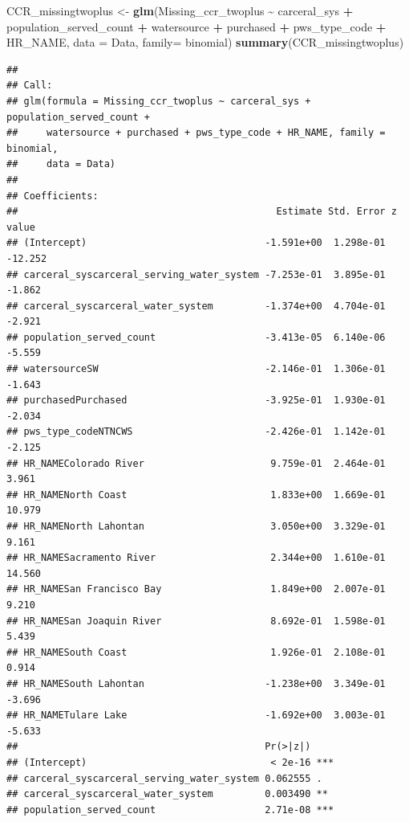 \documentclass[
]{article}
\newenvironment{Shaded}{\begin{snugshade}}{\end{snugshade}}
\newcommand{\AttributeTok}[1]{\textcolor[rgb]{0.13,0.29,0.53}{#1}}
\newcommand{\FunctionTok}[1]{\textcolor[rgb]{0.13,0.29,0.53}{\textbf{#1}}}
\newcommand{\NormalTok}[1]{#1}
\newcommand{\OtherTok}[1]{\textcolor[rgb]{0.56,0.35,0.01}{#1}}
\newcommand{\SpecialCharTok}[1]{\textcolor[rgb]{0.81,0.36,0.00}{\textbf{#1}}}
\begin{document}
\begin{Shaded}
\begin{Highlighting}[]
\NormalTok{CCR\_missingtwoplus }\OtherTok{\textless{}{-}} \FunctionTok{glm}\NormalTok{(Missing\_ccr\_twoplus }\SpecialCharTok{\textasciitilde{}}\NormalTok{ carceral\_sys }\SpecialCharTok{+}\NormalTok{ population\_served\_count }\SpecialCharTok{+}\NormalTok{ watersource }\SpecialCharTok{+}\NormalTok{ purchased }\SpecialCharTok{+}\NormalTok{ pws\_type\_code }\SpecialCharTok{+}\NormalTok{ HR\_NAME, }\AttributeTok{data =}\NormalTok{ Data, }\AttributeTok{family=}\NormalTok{ binomial)}
\FunctionTok{summary}\NormalTok{(CCR\_missingtwoplus)}
\end{Highlighting}
\end{Shaded}

\begin{verbatim}
## 
## Call:
## glm(formula = Missing_ccr_twoplus ~ carceral_sys + population_served_count + 
##     watersource + purchased + pws_type_code + HR_NAME, family = binomial, 
##     data = Data)
## 
## Coefficients:
##                                             Estimate Std. Error z value
## (Intercept)                               -1.591e+00  1.298e-01 -12.252
## carceral_syscarceral_serving_water_system -7.253e-01  3.895e-01  -1.862
## carceral_syscarceral_water_system         -1.374e+00  4.704e-01  -2.921
## population_served_count                   -3.413e-05  6.140e-06  -5.559
## watersourceSW                             -2.146e-01  1.306e-01  -1.643
## purchasedPurchased                        -3.925e-01  1.930e-01  -2.034
## pws_type_codeNTNCWS                       -2.426e-01  1.142e-01  -2.125
## HR_NAMEColorado River                      9.759e-01  2.464e-01   3.961
## HR_NAMENorth Coast                         1.833e+00  1.669e-01  10.979
## HR_NAMENorth Lahontan                      3.050e+00  3.329e-01   9.161
## HR_NAMESacramento River                    2.344e+00  1.610e-01  14.560
## HR_NAMESan Francisco Bay                   1.849e+00  2.007e-01   9.210
## HR_NAMESan Joaquin River                   8.692e-01  1.598e-01   5.439
## HR_NAMESouth Coast                         1.926e-01  2.108e-01   0.914
## HR_NAMESouth Lahontan                     -1.238e+00  3.349e-01  -3.696
## HR_NAMETulare Lake                        -1.692e+00  3.003e-01  -5.633
##                                           Pr(>|z|)    
## (Intercept)                                < 2e-16 ***
## carceral_syscarceral_serving_water_system 0.062555 .  
## carceral_syscarceral_water_system         0.003490 ** 
## population_served_count                   2.71e-08 ***

\end{verbatim}
\end{document}
